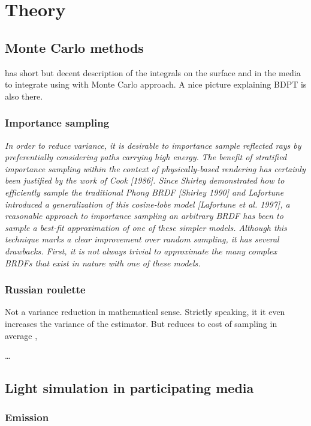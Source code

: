 \chapter{Theory}
\label{chapter:theory}


\section{Monte Carlo methods}
\label{Monte-Carlo}
\cite{Lafortune:1996:RPM:275458.275468} has short but decent description of the integrals on the
surface and in the media to integrate using with Monte Carlo approach.
A nice picture explaining BDPT is also there.
\subsection{Importance sampling}
\label{ImportanceSampling}
\emph{In order to reduce variance,  it is desirable to importance sample reflected rays by
preferentially considering paths carrying high energy.} \emph{The benefit of stratified importance
sampling  within  the  context  of  physically-based rendering  has  certainly  been  justified by 
the  work  of Cook  [1986].   Since  Shirley demonstrated  how  to  efficiently  sample  the 
traditional  Phong BRDF  [Shirley  1990]  and Lafortune  introduced  a  generalization of  this 
cosine-lobe  model  [Lafortune  et  al.  1997], a  reasonable approach to importance sampling an
arbitrary BRDF has been to sample  a  best-fit approximation  of  one  of  these  simpler  models.
Although this technique marks a clear improvement over random sampling,  it has several drawbacks.
First, it is not always trivial to approximate the many complex BRDFs that exist in nature with one
of these models.}

\subsection{Russian roulette}
\label{subsection:rr}
Not a variance reduction in mathematical sense. Strictly speaking, it it even
increases the variance of the estimator. But reduces to cost of sampling in
average \cite{Veach:1998:RMC:927297}, \cite{Csi03variancereduction}

\ldots

\section{Light simulation in participating media}
\subsection{Emission}
